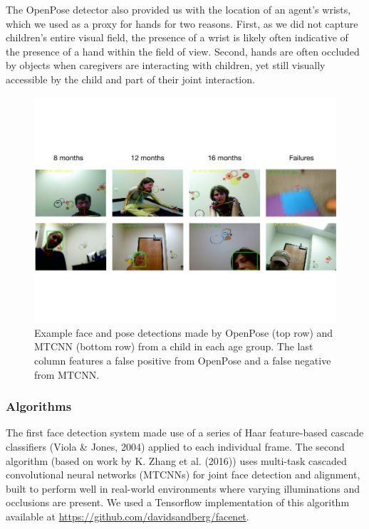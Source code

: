 \documentclass[english,man,floatsintext]{apa6}
\begin{document}
The OpenPose detector also provided us with the location of an agent's
wrists, which we used as a proxy for hands for two reasons. First, as we
did not capture children's entire visual field, the presence of a wrist
is likely often indicative of the presence of a hand within the field of
view. Second, hands are often occluded by objects when caregivers are
interacting with children, yet still visually accessible by the child
and part of their joint interaction.

\begin{figure}
\centering
\includegraphics[width=5.5in]{images/detector_samples_banner.pdf}
\caption{\label{fig:frames} Example face and pose detections made by OpenPose (top row) and MTCNN (bottom row) from a child in each age group. The last column features a false positive from OpenPose and a false negative from MTCNN.}
\end{figure}

\subsubsection{Algorithms}\label{algorithms}

The first face detection system made use of a series of Haar
feature-based cascade classifiers (Viola \& Jones, 2004) applied to each
individual frame. The second algorithm (based on work by K. Zhang et al.
(2016)) uses multi-task cascaded convolutional neural networks (MTCNNs)
for joint face detection and alignment, built to perform well in
real-world environments where varying illuminations and occlusions are
present. We used a Tensorflow implementation of this algorithm available
at \url{https://github.com/davidsandberg/facenet}.
\end{document}
